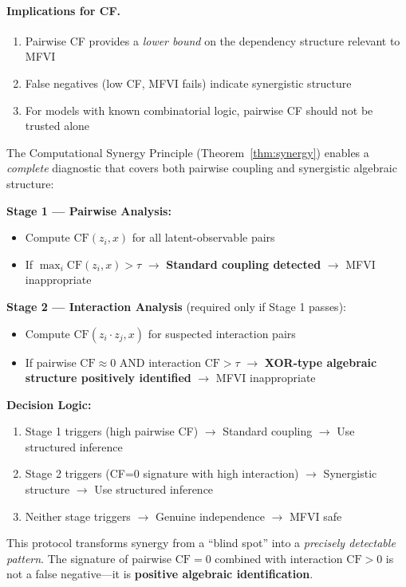 \documentclass[10pt]{article} %
\theoremstyle{plain}
\theoremstyle{definition}
\newcommand{\CF}{\mathrm{CF}}
\begin{document}
\paragraph{Implications for CF.}
\begin{enumerate}
    \item Pairwise CF provides a \emph{lower bound} on the dependency structure relevant to MFVI
    \item False negatives (low CF, MFVI fails) indicate synergistic structure
    \item For models with known combinatorial logic, pairwise CF should not be trusted alone
\end{enumerate}

\begin{tcolorbox}[breakable, colback=blue!5, colframe=blue!50!black, title=\textbf{The Complete Two-Stage CF Diagnostic Protocol}, fonttitle=\bfseries]
The Computational Synergy Principle (Theorem~\ref{thm:synergy}) enables a \emph{complete} diagnostic that covers both pairwise coupling and synergistic algebraic structure:

\textbf{Stage 1 --- Pairwise Analysis:}
\begin{itemize}
    \item Compute $\CF(z_i, x)$ for all latent-observable pairs
    \item If $\max_i \CF(z_i, x) > \tau$ $\rightarrow$ \textbf{Standard coupling detected} $\rightarrow$ MFVI inappropriate
\end{itemize}

\textbf{Stage 2 --- Interaction Analysis} (required only if Stage 1 passes):
\begin{itemize}
    \item Compute $\CF(z_i \cdot z_j, x)$ for suspected interaction pairs
    \item If pairwise $\CF \approx 0$ AND interaction $\CF > \tau$ $\rightarrow$ \textbf{XOR-type algebraic structure positively identified} $\rightarrow$ MFVI inappropriate
\end{itemize}

\textbf{Decision Logic:}
\begin{enumerate}
    \item Stage 1 triggers (high pairwise CF) $\rightarrow$ Standard coupling $\rightarrow$ Use structured inference
    \item Stage 2 triggers (CF=0 signature with high interaction) $\rightarrow$ Synergistic structure $\rightarrow$ Use structured inference
    \item Neither stage triggers $\rightarrow$ Genuine independence $\rightarrow$ MFVI safe
\end{enumerate}

This protocol transforms synergy from a ``blind spot'' into a \emph{precisely detectable pattern}. The signature of pairwise $\CF = 0$ combined with interaction $\CF > 0$ is not a false negative---it is \textbf{positive algebraic identification}.
\end{tcolorbox}
\end{document}
